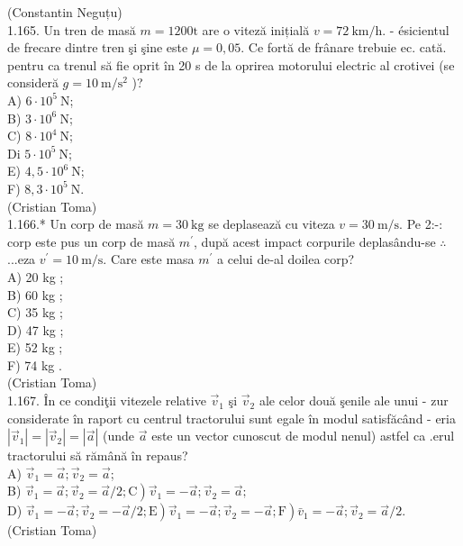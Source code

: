 \documentclass[10pt]{article}
\begin{document}
(Constantin Neguțu)\\
1.165. Un tren de masă $m=1200 \mathrm{t}$ are o viteză inițială $v=72 \mathrm{~km} / \mathrm{h}$. - ésicientul de frecare dintre tren şi şine este $\mu=0,05$. Ce fortă de frânare trebuie ec. cată. pentru ca trenul să fie oprit în 20 s de la oprirea motorului electric al crotivei (se consideră $g=10 \mathrm{~m} / \mathrm{s}^{2}$ )?\\
A) $6 \cdot 10^{5} \mathrm{~N}$;\\
B) $3 \cdot 10^{6} \mathrm{~N}$;\\
C) $8 \cdot 10^{4} \mathrm{~N}$;\\
Di $5 \cdot 10^{5} \mathrm{~N}$;\\
E) $4,5 \cdot 10^{6} \mathrm{~N}$;\\
F) $8,3 \cdot 10^{5} \mathrm{~N}$.\\
(Cristian Toma)\\
1.166.* Un corp de masă $m=30 \mathrm{~kg}$ se deplasează cu viteza $v=30 \mathrm{~m} / \mathrm{s}$. Pe 2:-: corp este pus un corp de masă $m^{\prime}$, după acest impact corpurile deplasându-se $\therefore$...eza $v^{\prime}=10 \mathrm{~m} / \mathrm{s}$. Care este masa $m^{\prime}$ a celui de-al doilea corp?\\
A) 20 kg ;\\
B) 60 kg ;\\
C) 35 kg ;\\
D) 47 kg ;\\
E) 52 kg ;\\
F) 74 kg .\\
(Cristian Toma)\\
1.167. În ce condiţii vitezele relative $\vec{v}_{1}$ şi $\vec{v}_{2}$ ale celor două şenile ale unui - zur considerate în raport cu centrul tractorului sunt egale în modul satisfăcând - eria $\left|\vec{v}_{1}\right|=\left|\vec{v}_{2}\right|=|\vec{a}|$ (unde $\vec{a}$ este un vector cunoscut de modul nenul) astfel ca .erul tractorului să rămână în repaus?\\
A) $\vec{v}_{1}=\vec{a} ; \vec{v}_{2}=\vec{a}$;\\
B) $\left.\vec{v}_{1}=\vec{a} ; \vec{v}_{2}=\vec{a} / 2 ; \mathrm{C}\right) \vec{v}_{1}=-\vec{a} ; \vec{v}_{2}=\vec{a} ;$\\
D) $\left.\left.\vec{v}_{1}=-\vec{a} ; \vec{v}_{2}=-\vec{a} / 2 ; \mathrm{E}\right) \vec{v}_{1}=-\vec{a} ; \vec{v}_{2}=-\vec{a} ; \mathrm{F}\right) \bar{v}_{1}=-\vec{a} ; \vec{v}_{2}=\vec{a} / 2$.\\
(Cristian Toma)\\
\end{document}
